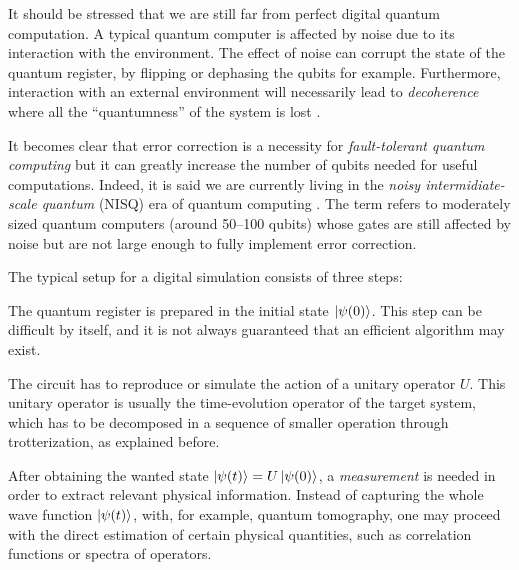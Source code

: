 \medskip

It should be stressed that we are still far from perfect digital quantum computation.
A typical quantum computer is affected by noise due to its interaction with the environment.
The effect of noise can corrupt the state of the quantum register, by flipping or dephasing the qubits for example.
Furthermore, interaction with an external environment will necessarily lead to \emph{decoherence} where all the ``quantumness'' of the system is lost \cite{zurek1991decoherence, schlosshauer2014decoherence, schlosshauer2019decoherence}.

It becomes clear that error correction is a necessity for \emph{fault-tolerant quantum computing} \cite{preskill1997faulttolerant, shor1996faulttolerant} but it can greatly increase the number of qubits needed for useful computations.
Indeed, it is said we are currently living in the \emph{noisy intermidiate-scale quantum} (NISQ) era of quantum computing \cite{preskill2018quantumcomputing}.
The term refers to moderately sized quantum computers (around 50--100 qubits) whose gates are still affected by noise but are not large enough to fully implement error correction.

\medskip

The typical setup for a digital simulation consists of three steps:
\begin{description}[font=\normalfont\itshape, labelsep=1.1em]
    \item[Initial-state preparation.] The quantum register is prepared in the initial state $\ket{\psi(0)}$.
        This step can be difficult by itself, and it is not always guaranteed that an efficient algorithm may exist.

    \item[Unitary evolution.] The circuit has to reproduce or simulate the action of a unitary operator $U$.
        This unitary operator is usually the time-evolution operator of the target system, which has to be decomposed in a sequence of smaller operation through trotterization, as explained before.

    \item[Final measurement.] After obtaining the wanted state $\ket{\psi(t)} = U \ket{\psi(0)}$, a \emph{measurement} is needed in order to extract relevant physical information.
        Instead of capturing the whole wave function $\ket{\psi(t)}$, with, for example, quantum tomography, one may proceed with the direct estimation of certain physical quantities, such as correlation functions or spectra of operators.
\end{description}




